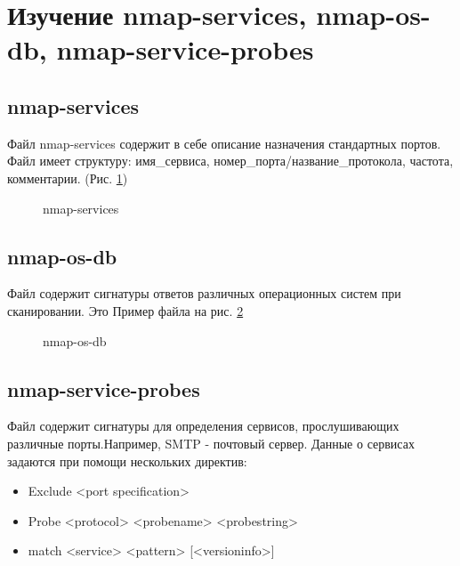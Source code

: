 \documentclass[10pt,a4paper]{report}
\begin{document}
\section{Изучение nmap-services, nmap-os-db, nmap-service-probes}
\subsection{nmap-services}
Файл nmap-services содержит в себе описание назначения стандартных портов. Файл имеет структуру: имя\_сервиса, номер\_порта/название\_протокола, частота, комментарии. (Рис. \ref{pic:pic6})
			\begin{figure}[ht]	
	\caption{nmap-services}
	\label{pic:pic6}
\end{figure} 

\subsection{nmap-os-db}
Файл содержит сигнатуры ответов различных операционных систем при сканировании. Это  Пример файла на рис. \ref{pic:pic7}

	\begin{figure}[ht]	
	\caption{nmap-os-db}
	\label{pic:pic7}
\end{figure} 		

\subsection{nmap-service-probes}
Файл содержит сигнатуры для определения сервисов, прослушивающих различные порты.Например, SMTP - почтовый сервер. Данные о сервисах задаются при помощи нескольких директив:
			\begin{itemize}
				\item Exclude <port specification>
				\item Probe <protocol> <probename> <probestring>
				\item match <service> <pattern> [<versioninfo>]
			\end{itemize}
			
\end{document}
